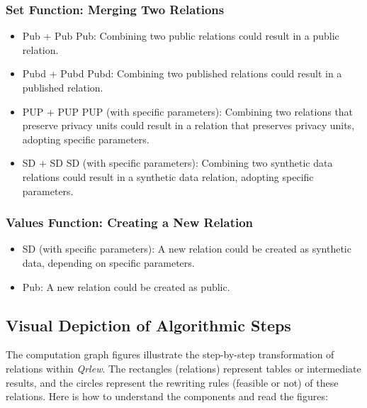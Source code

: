 \documentclass[letterpaper]{article} %
\newcommand{\qrlew}{\emph{Qrlew}}
\begin{document}
\subsubsection*{Set Function: Merging Two Relations}
\begin{itemize}
    \item Pub + Pub \textrightarrow{} Pub: Combining two public relations could result in a public relation.
    \item Pubd + Pubd \textrightarrow{} Pubd: Combining two published relations could result in a published relation.
    \item PUP + PUP \textrightarrow{} PUP (with specific parameters): Combining two relations that preserve privacy units could result in a relation that preserves privacy units, adopting specific parameters.
    \item SD + SD \textrightarrow{} SD (with specific parameters): Combining two synthetic data relations could result in a synthetic data relation, adopting specific parameters.
\end{itemize}

\subsubsection*{Values Function: Creating a New Relation}
\begin{itemize}
    \item \textrightarrow{} SD (with specific parameters): A new relation could be created as synthetic data, depending on specific parameters.
    \item \textrightarrow{} Pub: A new relation could be created as public.
\end{itemize}

\bigskip
\subsection*{Visual Depiction of Algorithmic Steps}
\label{sec:graphviz}

The computation graph figures illustrate the step-by-step transformation of relations within \qrlew{}. The rectangles (relations) represent tables or intermediate results, and the circles represent the rewriting rules (feasible or not) of these relations. Here is how to understand the components and read the figures:
\end{document}
